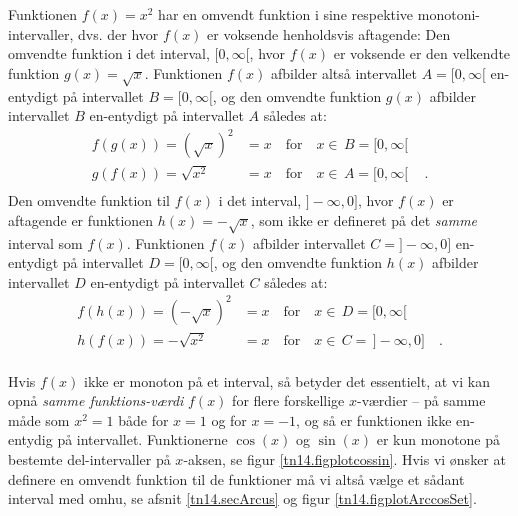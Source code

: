 Funktionen $f(x) = x^{2}$ har en omvendt funktion i sine respektive monotoni-intervaller, dvs. der hvor $f(x)$ er voksende henholdsvis aftagende:
Den omvendte funktion i det interval, $[0, \infty[$,  hvor $f(x)$ er voksende er den velkendte funktion $g(x) = \sqrt{x}$. Funktionen $f(x)$ afbilder
altså intervallet $ A = [0, \infty[$ en-entydigt på intervallet $B = [0, \infty[$, og den omvendte funktion $g(x)$ afbilder intervallet $B$ en-entydigt på intervallet $A$
således at:
\begin{equation}
\begin{aligned}
f(g(x))= (\sqrt{x})^{2} &= x \quad \textrm{for} \quad x \in \, B = [0, \infty[ \\
g(f(x)) = \sqrt{x^{2}} & = x \quad \textrm{for} \quad x \in \, A = [0, \infty[\,  \quad .\\
\end{aligned}
\end{equation}
Den omvendte funktion til $f(x)$ i det interval, $]-\infty, 0]$,  hvor $f(x)$ er aftagende er funktionen $h(x) = -\sqrt{x}$, som ikke er defineret på det {\emph{samme}} interval som $f(x)$.
Funktionen $f(x)$ afbilder
intervallet $ C = ]-\infty, 0]$ en-entydigt på intervallet $D = [0, \infty[$, og den omvendte funktion $h(x)$ afbilder intervallet $D$ en-entydigt på intervallet $C$
således at:
\begin{equation}
\begin{aligned}
f(h(x))= (-\sqrt{x})^{2} &= x \quad \textrm{for} \quad x \in \,D = [0, \infty[  \\
h(f(x)) = -\sqrt{x^{2}} & = x \quad \textrm{for} \quad x \in \, C = \,  ]-\infty, 0] \quad .\\
\end{aligned}
\end{equation}




\begin{think}
Hvis $f(x)$ ikke er monoton på et interval, så betyder det essentielt, at vi kan opnå \emph{samme funktions-værdi} $f(x)$ for flere forskellige $x$-værdier -- på samme måde som $x^{2}= 1$ både for $x=1$ og for $x=-1$, og så er funktionen ikke en-entydig på intervallet.
Funktionerne $\cos(x)$ og $\sin(x)$ er kun monotone på bestemte del-intervaller på $x$-aksen, se figur \ref{tn14.figplotcossin}.
Hvis vi ønsker at definere en omvendt funktion til de funktioner må vi altså vælge et sådant interval med omhu, se afsnit \ref{tn14.secArcus} og figur \ref{tn14.figplotArccosSet}.
\end{think}


